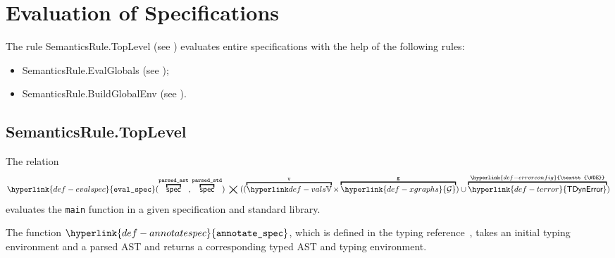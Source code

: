 \documentclass{book}
\newcommand\XGraphs[0]{\hyperlink{def-xgraphs}{\mathcal{G}}}
\newcommand\ErrorConfig[0]{\hyperlink{def-errorconfig}{\texttt{\#DE}}}
\newcommand\TError[0]{\hyperlink{def-terror}{\textsf{TDynError}}}
\newcommand\evalspec[1]{\hyperlink{def-evalspec}{\texttt{eval\_spec}}(#1)}
\newcommand\parsedstd[0]{\texttt{parsed\_std}}
\newcommand\parsedast[0]{\texttt{parsed\_ast}}
\newcommand\vg[0]{\texttt{g}}
\begin{document}
\chapter{Evaluation of Specifications \label{chap:eval_spec}}
The rule SemanticsRule.TopLevel (see )
evaluates entire specifications with the help of the following rules:
\begin{itemize}
  \item SemanticsRule.EvalGlobals (see );
  \item SemanticsRule.BuildGlobalEnv (see ).
\end{itemize}

\section{SemanticsRule.TopLevel \label{sec:SemanticsRule.TopLevel}}
The relation
\hypertarget{def-evalspec}{}
\[
  \evalspec{\overname{\spec}{\parsedast}, \overname{\spec}{\parsedstd}} \;\aslrel\;
   ((\overname{\vals}{\vv}\times \overname{\XGraphs}{\vg}) \cup \overname{\TError}{\ErrorConfig})
\]
evaluates the \texttt{main} function in a given specification and standard library.

\newcommand\annotatespec[0]{\hyperlink{def-annotatespec}{\texttt{annotate\_spec}}}
\hypertarget{def-annotatespec}{}
The function $\annotatespec$, which is defined in the typing reference~\cite{ASLTypingReference},
takes an initial typing environment and a parsed AST and returns a corresponding typed AST and typing
environment.
\end{document}
